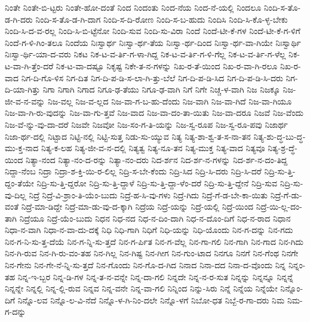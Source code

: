 {ನಿಂತೇ
ನಿಂತೇ-ಬಿ-ಟ್ಟರು
ನಿಂತೇ-ಹೋ-ದಂತೆ
ನಿಂದ
ನಿಂದಂತು
ನಿಂದ-ನೆಯ
ನಿಂದ-ನೆ-ಯಲ್ಲಿ
ನಿಂದಲೂ
ನಿಂದಿ-ಸ-ತೊ-ಡ-ಗಿ-ದರು
ನಿಂದಿ-ಸ-ತೊ-ಡ-ಗಿ-ದಾಗ
ನಿಂದಿ-ಸ-ದಿ-ರೋಣ
ನಿಂದಿ-ಸ-ಬ-ಹುದು
ನಿಂದಿಸಿ
ನಿಂದಿ-ಸಿ-ಕೊ-ಳ್ಳ-ಬೇಕು
ನಿಂದಿ-ಸಿ-ದ-ವ-ರಲ್ಲ
ನಿಂದಿ-ಸಿ-ಬಿ-ಟ್ಟೆನೋ
ನಿಂದಿ-ಸುವ
ನಿಂದಿ-ಸು-ವಿರಾ
ನಿಂದೆ
ನಿಂದೆ-ಟೀ-ಕೆ-ಗಳ
ನಿಂದೆ-ಟೀ-ಕೆ-ಗ-ಳಿಗೆ
ನಿಂದೆ-ಗ-ಳಿ-ಗಿಂ-ತಲೂ
ನಿಂದೆಯ
ನಿಃಸ್ವಾರ್ಥ
ನಿಃಸ್ವಾ-ರ್ಥ-ತೆಯ
ನಿಃಸ್ವಾ-ರ್ಥ-ದಿಂದ
ನಿಃಸ್ವಾ-ರ್ಥ-ವಾ-ಗಿಯೇ
ನಿಃಸ್ವಾರ್ಥಿ
ನಿಃಸ್ವಾ-ರ್ಥಿ-ಯಾ-ದ-ವರು
ನಿಕಟ
ನಿಕ-ಟ-ವ-ರ್ತಿ-ಗ-ಳಾ-ಗಿದ್ದ
ನಿಕ-ಟ-ವ-ರ್ತಿ-ಗ-ಳಿ-ಗೆಲ್ಲ
ನಿಕ-ಟ-ವ-ರ್ತಿ-ಗ-ಳೆಲ್ಲ
ನಿಕ-ಟ-ವಾ-ಗಿ-ತ್ತೆಂ-ದರೆ
ನಿಕ-ಟ-ವಾ-ದಷ್ಟೂ
ನಿಕೃಷ್ಟ
ನಿಕೇ-ತ-ನ-ಗಳನ್ನು
ನಿಖ-ರ-ತೆ-ಯಿಂದ
ನಿಖ-ರ-ವಾ-ಗಿ-ರಲೂ
ನಿಖ-ರ-ವಾದ
ನಿಗ-ದಿ-ಗೊ-ಳಿಸ
ನಿಗ-ದಿತ
ನಿಗ-ದಿ-ಪ-ಡಿ-ಸ-ಲಾ-ಗಿ-ತ್ತು-ಬೆಲೆ
ನಿಗ-ದಿ-ಪ-ಡಿ-ಸಿದ
ನಿಗ-ದಿ-ಪ-ಡಿ-ಸಿ-ದರು
ನಿಗ-ದಿ-ಯಾ-ಗಿತ್ತು
ನಿಗಾ
ನಿಗಾಗಿ
ನಿಗಾದ
ನಿಗೂ-ಢ-ತೆಯು
ನಿಗೂ-ಢ-ವಾಗಿ
ನಿಗೆ
ನಿಗೇ
ನಿಚ್ಚ-ಳ-ವಾಗಿ
ನಿಜ
ನಿಜಕ್ಕೂ
ನಿಜ-ಜೀ-ವ-ನ-ವನ್ನು
ನಿಜ-ವಲ್ಲ
ನಿಜ-ವ-ಲ್ಲದ
ನಿಜ-ವಾ-ಗ-ಬ-ಹು-ದೆಂದು
ನಿಜ-ವಾಗಿ
ನಿಜ-ವಾ-ಗಿದೆ
ನಿಜ-ವಾ-ಗಿಯೂ
ನಿಜ-ವಾ-ಗಿ-ರು-ವುದನ್ನು
ನಿಜ-ವಾ-ಗು-ತ್ತವೆ
ನಿಜ-ವಾದ
ನಿಜ-ವಾ-ದಂ-ತಾ-ಯಿತು
ನಿಜ-ವಾ-ದರೂ
ನಿಜವೆ
ನಿಜ-ವೆಂದು
ನಿಜ-ವೆ-ನ್ನು-ವು-ದಾ-ದರೆ
ನಿಜವೇ
ನಿಜವೋ
ನಿಜ-ಸಂ-ಗ-ತಿ-ಯನ್ನು
ನಿಜ-ಸ್ವ-ರೂಪ
ನಿಜ-ಸ್ವ-ರೂ-ಪವು
ನಿಜಾರ್ಥ
ನಿಜಾ-ರ್ಥ-ದಲ್ಲಿ
ನಿಟ್ಟಾದ
ನಿಟ್ಟಿ-ನಲ್ಲಿ
ನಿಟ್ಟಿ-ಸುತ್ತ
ನಿಡು-ಸು-ಯ್ಯುವ
ನಿತ್ಯ
ನಿತ್ಯ-ಶಾ-ಶ್ವ-ತ-ಸ-ನಾ-ತನ
ನಿತ್ಯ-ಶು-ದ್ಧ-ಬು-ದ್ಧ-ಮು-ಕ್ತ-ನಾದ
ನಿತ್ಯ-ಕ-ಲಹ
ನಿತ್ಯ-ಜೀ-ವ-ನ-ದಲ್ಲಿ
ನಿತ್ಯತ್ವ
ನಿತ್ಯ-ನೂ-ತನ
ನಿತ್ಯ-ಮುಕ್ತ
ನಿತ್ಯ-ವಾದ
ನಿತ್ಯವೂ
ನಿತ್ಯ-ಶ್ರ-ದ್ಧೆ-ಯಿಂದ
ನಿತ್ಯಾ-ನಂದ
ನಿತ್ಯಾ-ನಂ-ದ-ರನ್ನು
ನಿತ್ಯಾ-ನಂ-ದರು
ನಿದ-ರ್ಶನ
ನಿದ-ರ್ಶ-ನ-ಗಳನ್ನು
ನಿದ-ರ್ಶ-ನ-ದಂ-ತಿದ್ದ
ನಿದ್ದಾ-ನೆಂಬ
ನಿದ್ರಾ
ನಿದ್ರಾ-ಶ-ಕ್ತಿ-ಯಿ-ರ-ಲಿಲ್ಲ
ನಿದ್ರಿ-ಸ-ಬೇ-ಕೆಂದು
ನಿದ್ರಿ-ಸಿದ
ನಿದ್ರಿ-ಸಿ-ದರು
ನಿದ್ರಿ-ಸಿ-ದರೆ
ನಿದ್ರಿ-ಸು-ತ್ತಿ-ದ್ದಂ-ತೆಯೇ
ನಿದ್ರಿ-ಸು-ತ್ತಿ-ದ್ದರೋ
ನಿದ್ರಿ-ಸು-ತ್ತಿ-ದ್ದಾಳೆ
ನಿದ್ರಿ-ಸು-ತ್ತಿ-ದ್ದಾ-ಳೆಂ-ದರೆ
ನಿದ್ರಿ-ಸು-ತ್ತಿ-ದ್ದೇನೆ
ನಿದ್ರಿ-ಸುವ
ನಿದ್ರಿ-ಸು-ವು-ದಿಲ್ಲ
ನಿದ್ರೆ
ನಿದ್ರೆ-ವಿ-ಶ್ರಾಂ-ತಿ-ಯೆಂ-ಬುದು
ನಿದ್ರೆ-ಹ-ಸಿ-ವು-ಗಳು
ನಿದ್ರೆ-ಗಿದು
ನಿದ್ರೆ-ಗೆ-ಡ-ಬೇ-ಕಾ-ಯಿತು
ನಿದ್ರೆ-ಗೆ-ಡು-ವಂತೆ
ನಿದ್ರೆ-ಮಾ-ಡಿದ್ದೇ
ನಿದ್ರೆ-ಮಾ-ಡು-ವು-ದ-ಕ್ಕಾಗಿ
ನಿದ್ರೆಯ
ನಿದ್ರೆ-ಯನ್ನು
ನಿದ್ರೆ-ಯಲ್ಲಿ
ನಿದ್ರೆ-ಯಿಂದ
ನಿದ್ರೆ-ಯಿ-ಲ್ಲ-ದಂ-ತಾಗಿ
ನಿದ್ರೆಯೂ
ನಿದ್ರೆ-ಯೆಂ-ಬುದು
ನಿಧನ
ನಿಧ-ನದ
ನಿಧ-ನ-ದಿಂ-ದಾಗಿ
ನಿಧ-ನ-ದೊಂ-ದಿಗೆ
ನಿಧ-ನ-ರಾದ
ನಿಧಾನ
ನಿಧಾ-ನ-ವಾಗಿ
ನಿಧಾ-ನ-ವಾ-ದು-ದಕ್ಕೆ
ನಿಧಿ
ನಿಧಿ-ಗಾಗಿ
ನಿಧಿಗೆ
ನಿಧಿ-ಯನ್ನು
ನಿಧಿ-ಯೊಂದು
ನಿನ-ಗ-ದನ್ನು
ನಿನ-ಗದು
ನಿನ-ಗ-ನಿ-ಸು-ತ್ತ-ದೆಯೆ
ನಿನ-ಗ-ನ್ನಿ-ಸು-ತ್ತದೆ
ನಿನ-ಗ-ರ್ಪಿತ
ನಿನ-ಗ-ವೆಲ್ಲ
ನಿನ-ಗಾ-ಗಲಿ
ನಿನ-ಗಾಗಿ
ನಿನ-ಗಾದ
ನಿನ-ಗಿದು
ನಿನ-ಗಿ-ರುವ
ನಿನ-ಗಿ-ರು-ವಂ-ತಹ
ನಿನ-ಗಿಲ್ಲ
ನಿನ-ಗಿಷ್ಟ
ನಿನ-ಗೀಗ
ನಿನ-ಗುಂ-ಟಾದ
ನಿನಗೂ
ನಿನಗೆ
ನಿನ-ಗೆಂಥ
ನಿನಗೇ
ನಿನ-ಗೇನು
ನಿನ-ಗೇ-ನೆ-ನ್ನಿ-ಸು-ತ್ತದೆ
ನಿನ-ಗೊಂದು
ನಿನ-ಗೊ-ದ-ಗಿದ
ನಿನಾದ
ನಿನಾ-ದದ
ನಿನಾ-ದ-ವೊಂದು
ನಿನ್ನ
ನಿನ್ನಂ-ತಹ
ನಿನ್ನ-ಇ-ಬ್ಬರ
ನಿನ್ನ-ಡಿ-ಗಳ
ನಿನ್ನ-ತ-ನ-ವನ್ನೇ
ನಿನ್ನ-ದಾ-ಗಲಿ
ನಿನ್ನದೇ
ನಿನ್ನ-ನ-ರ-ಸುತ
ನಿನ್ನನ್ನು
ನಿನ್ನನ್ನೂ
ನಿನ್ನನ್ನೆ
ನಿನ್ನನ್ನೇ
ನಿನ್ನಲ್ಲಿ
ನಿನ್ನ-ಲ್ಲಿ-ರುವ
ನಿನ್ನವ
ನಿನ್ನ-ವನೇ
ನಿನ್ನ-ವಾ-ಗಲಿ
ನಿನ್ನಿಂದ
ನಿನ್ನು-ಸಿರು
ನಿನ್ನೆ
ನಿನ್ನೆಯ
ನಿನ್ನೆಯೇ
ನಿನ್ನೊಂ-ದಿಗೆ
ನಿನ್ನೊ-ಲವ
ನಿನ್ನೊ-ಲ-ವಿ-ನೆದೆ
ನಿನ್ನೊ-ಳ-ಗಿ-ನಿಂ-ದಲೇ
ನಿನ್ನೊ-ಳಗೆ
ನಿಬೋ-ಧತ
ನಿಬ್ಬೆ-ರ-ಗಾ-ದರು
ನಿಮ
ನಿಮ-ಗ-ದನ್ನು
}
